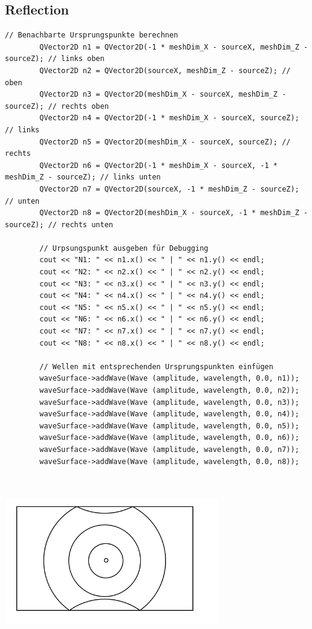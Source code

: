 \documentclass[12pt,a4paper]{scrartcl}
\begin{document}
\subsection{Reflection}
\begin{lstlisting}[language=PSEUDO]
// Benachbarte Ursprungspunkte berechnen
        QVector2D n1 = QVector2D(-1 * meshDim_X - sourceX, meshDim_Z - sourceZ); // links oben
        QVector2D n2 = QVector2D(sourceX, meshDim_Z - sourceZ); // oben
        QVector2D n3 = QVector2D(meshDim_X - sourceX, meshDim_Z - sourceZ); // rechts oben
        QVector2D n4 = QVector2D(-1 * meshDim_X - sourceX, sourceZ); // links
        QVector2D n5 = QVector2D(meshDim_X - sourceX, sourceZ); // rechts
        QVector2D n6 = QVector2D(-1 * meshDim_X - sourceX, -1 * meshDim_Z - sourceZ); // links unten
        QVector2D n7 = QVector2D(sourceX, -1 * meshDim_Z - sourceZ); // unten
        QVector2D n8 = QVector2D(meshDim_X - sourceX, -1 * meshDim_Z - sourceZ); // rechts unten

        // Urpsungspunkt ausgeben für Debugging
        cout << "N1: " << n1.x() << " | " << n1.y() << endl;
        cout << "N2: " << n2.x() << " | " << n2.y() << endl;
        cout << "N3: " << n3.x() << " | " << n3.y() << endl;
        cout << "N4: " << n4.x() << " | " << n4.y() << endl;
        cout << "N5: " << n5.x() << " | " << n5.y() << endl;
        cout << "N6: " << n6.x() << " | " << n6.y() << endl;
        cout << "N7: " << n7.x() << " | " << n7.y() << endl;
        cout << "N8: " << n8.x() << " | " << n8.y() << endl;

        // Wellen mit entsprechenden Ursprungspunkten einfügen
        waveSurface->addWave(Wave (amplitude, wavelength, 0.0, n1));
        waveSurface->addWave(Wave (amplitude, wavelength, 0.0, n2));
        waveSurface->addWave(Wave (amplitude, wavelength, 0.0, n3));
        waveSurface->addWave(Wave (amplitude, wavelength, 0.0, n4));
        waveSurface->addWave(Wave (amplitude, wavelength, 0.0, n5));
        waveSurface->addWave(Wave (amplitude, wavelength, 0.0, n6));
        waveSurface->addWave(Wave (amplitude, wavelength, 0.0, n7));
        waveSurface->addWave(Wave (amplitude, wavelength, 0.0, n8));



\end{lstlisting}

\includegraphics[width=0.7\textwidth]{Images/Reflextion.png}
\end{document}
